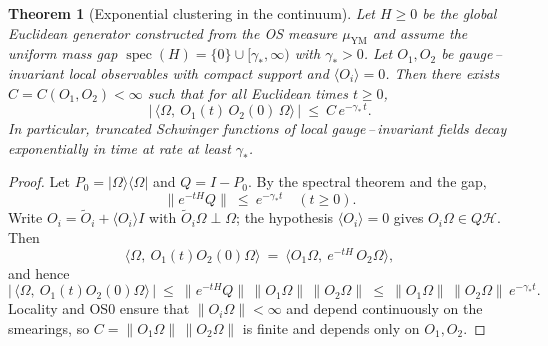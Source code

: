 \documentclass[11pt]{amsart}
\theoremstyle{plain}
\newtheorem{theorem}{Theorem}[section]
\theoremstyle{definition}
\theoremstyle{remark}
\begin{document}
\begin{theorem}[Exponential clustering in the continuum]\label{thm:cont-exp-cluster}
Let $H\ge 0$ be the global Euclidean generator constructed from the OS measure $\mu_{\mathrm{YM}}$ and assume the uniform mass gap $\operatorname{spec}(H)=\{0\}\cup[\gamma_*,\infty)$ with $\gamma_*>0$. Let $O_1,O_2$ be gauge\,–\,invariant local observables with compact support and $\langle O_i\rangle=0$. Then there exists $C=C(O_1,O_2)<\infty$ such that for all Euclidean times $t\ge 0$,
\[
  \big|\,\langle\Omega,\ O_1(t)\,O_2(0)\,\Omega\rangle\,\big|\ \le\ C\,e^{-\gamma_*\,t}.
\]
In particular, truncated Schwinger functions of local gauge\,–\,invariant fields decay exponentially in time at rate at least $\gamma_*$.
\end{theorem}
\begin{proof}
Let $P_0=\vert\Omega\rangle\langle\Omega\vert$ and $Q=I-P_0$. By the spectral theorem and the gap,
\[
  \| e^{-tH} Q \|\ \le\ e^{-\gamma_* t}\quad (t\ge 0).
\]
Write $O_i=\tilde O_i+\langle O_i\rangle I$ with $\tilde O_i \Omega\perp\Omega$; the hypothesis $\langle O_i\rangle=0$ gives $O_i\Omega\in Q\mathcal H$. Then
\[
  \langle\Omega,\ O_1(t) O_2(0)\Omega\rangle\ =\ \langle O_1\Omega,\ e^{-tH}\,O_2\Omega\rangle,
\]
and hence
\[
  \big|\,\langle\Omega,\ O_1(t) O_2(0)\Omega\rangle\,\big|\ \le\ \| e^{-tH} Q \|\,\|O_1\Omega\|\,\|O_2\Omega\|\ \le\ \|O_1\Omega\|\,\|O_2\Omega\|\,e^{-\gamma_* t}.
\]
Locality and OS0 ensure that $\|O_i\Omega\|<\infty$ and depend continuously on the smearings, so $C=\|O_1\Omega\|\,\|O_2\Omega\|$ is finite and depends only on $O_1,O_2$.
\end{proof}
\end{document}
